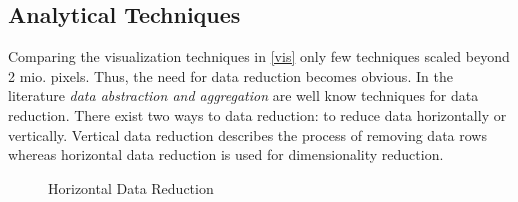\subsection{Analytical Techniques}\label{analytical}
Comparing the visualization techniques in \ref{vis} only few techniques scaled beyond 2 mio. pixels. Thus, the need for data reduction becomes obvious. In the literature \textit{data abstraction and aggregation} are well know techniques for data reduction\cite{FerreiradeOliveira2003,Aigner2011, Keim2005}. There exist two ways to data reduction: to reduce data horizontally or vertically. 
Vertical data reduction describes the process of removing data rows whereas horizontal data reduction is used for dimensionality reduction. 
\begin{figure}[H]
    \centering
    \caption{Horizontal Data Reduction}
    \label{fig:my_label}
\end{figure}

